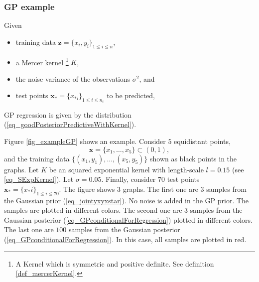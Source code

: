 \subsubsection{GP example}

Given
\begin{itemize}
  \item training data $\pmb{z} = \{ x_i,y_i \}_{1 \leq i \leq n}$,
  \item a Mercer kernel \footnote{A Kernel which is symmetric and positive definite. See definition \ref{def_mercerKernel}.} $K$,
  \item the noise variance of the observations $\sigma^2$, and
  \item test points $\pmb{x_*} = \{ x_{*i} \}_{1 \leq i \leq n_t}$ to be predicted,
\end{itemize}
GP regression is given by the distribution (\ref{eq_goodPosteriorPredictiveWithKernel}).

Figure \ref{fig_exampleGP} shows an example. Consider $5$ equidistant points, 
$$\pmb{x} = \{x_1, \dots, x_5\} \subset (0,1),$$
and the training data $\{(x_1,y_1), \dots, (x_5,y_5)\}$ shown as black points in the graphs. Let $K$ be an squared exponential kernel with length-scale $l=0.15$ (see \ref{eq_SExpKernel}).
Let $\sigma = 0.05$. Finally, consider $70$ test points $\pmb{x_*} = \{x_*i\}_{1 \leq i \leq 70}$. The figure shows $3$ graphs. The first one are $3$ samples from the Gaussian prior (\ref{eq_jointyxyxstar}). No noise is added in the GP prior. The samples are plotted in different colors. The second one are $3$ samples from the Gaussian posterior (\ref{eq_GPconditionalForRegression}) plotted in different colors. The last one are $100$ samples from the Gaussian posterior (\ref{eq_GPconditionalForRegression}). In this case, all samples are plotted in red.

